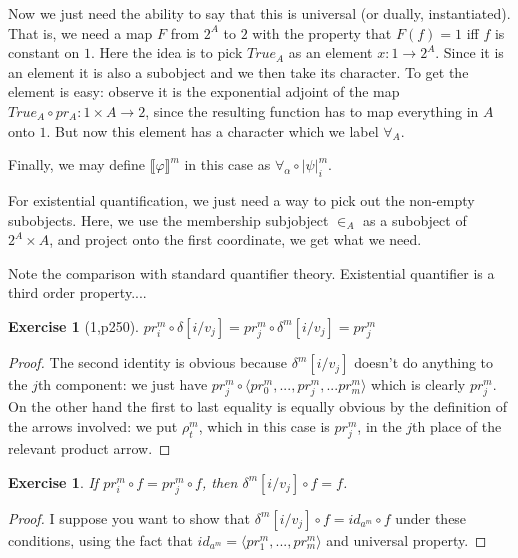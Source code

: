 \documentclass{asl}
\newtheorem{Exercise}[Theorem]{Exercise}
\theoremstyle{definition}
\begin{document}
Now we just need the ability to say that this is universal (or dually, instantiated). That is, we need a map $F$ from $2^A$ to $2$ with the property that $F(f) = 1$ iff $f$ is constant on $1$. Here the idea is to pick $True_A$ as an element $x: 1 \to 2^A$. Since it is an element it is also a subobject and we then take its character. To get the element is easy: observe it is the exponential adjoint of the map $True_A \circ pr_A : 1 \times A \to 2$, since the resulting function has to map everything in $A$ onto $1$. But now this element has a character which we label $\forall_A$. 

Finally, we may define $\llbracket \varphi \rrbracket^m$ in this case as $\forall_\alpha \circ |\psi|^m_i$.

For existential quantification, we just need a way to pick out the non-empty subobjects. Here, we use the membership subjobject $\in_A$ as a subobject of $2^A \times A$, and project onto the first coordinate, we get what we need.

Note the comparison with standard quantifier theory. Existential quantifier is a third order property....

\begin{Exercise}[1,p250]
$pr^m_i \circ \delta[i/v_j] = pr^m_j \circ \delta ^m[i/v_j] = pr^m_j$
\end{Exercise}
\begin{proof}
The second identity is obvious because $\delta^m[i/v_j]$ doesn't do anything to the $j$th component: we just have $pr^m_j \circ \langle pr^m_0,...,pr^m_j,... pr^m_m \rangle$ which is clearly $pr^m_j$. On the other hand the first to last equality is equally obvious by the definition of the arrows involved: we put $\rho^m_t$, which in this case is $pr^m_j$, in the $j$th place of the relevant product arrow.
\end{proof}
\begin{Exercise}
If $pr^m_i \circ f = pr^m_j \circ f$, then $\delta^m[i/v_j] \circ f = f$.
\end{Exercise}
\begin{proof}
I suppose you want to show that $\delta^m[i/v_j] \circ f = id_{a^m} \circ f$ under these conditions, using the fact that $id_{a^m} = \langle pr^m_1,..., pr^m_m \rangle$ and universal property.
\end{proof}


\end{document}
